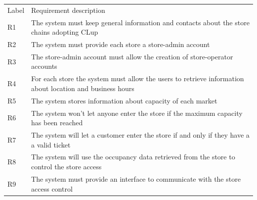 \renewcommand{\arraystretch}{1.4}
\begin{tabular}{C{1cm}L{14.1cm}}
    Label & Requirement description                                                                                                                                                                     \\

    R1   & The system must keep general information and contacts about the store chains adopting CLup                                                                                                  \\
    R2   & The system must provide each store a store-admin account                                                                                                                                    \\
    R3   & The store-admin account must allow the creation of store-operator accounts                                                                                                                  \\
    R4   & For each store the system must allow the users to retrieve information about location and business hours                                                                                    \\
    R5   & The system stores information about capacity of each market                                                                                                                                 \\
    R6   & The system won't let anyone enter the store if the maximum capacity has been reached                                                                                                        \\
    R7   & The system will let a customer enter the store if and only if they have a a valid ticket                                                                                                       \\
    R8   & The system will use the occupancy data retrieved from the store to control the store access                                                                                           \\
    R9   & The system must provide an interface to communicate with the store access control                                                                                                        \\

\end{tabular}
